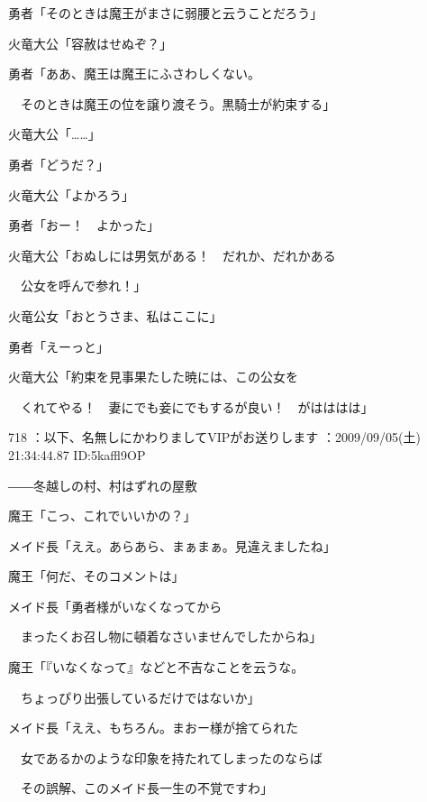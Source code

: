 \documentclass[a4j,twocolumn]{tarticle}
\begin{document}
勇者「そのときは魔王がまさに弱腰と云うことだろう」 



火竜大公「容赦はせぬぞ？」 



勇者「ああ、魔王は魔王にふさわしくない。\par{} 
　そのときは魔王の位を譲り渡そう。黒騎士が約束する」 



火竜大公「……」\par{} 
勇者「どうだ？」 



火竜大公「よかろう」\par{} 
勇者「おー！　よかった」 



火竜大公「おぬしには男気がある！　だれか、だれかある\par{} 
　公女を呼んで参れ！」 



火竜公女「おとうさま、私はここに」\par{} 
勇者「えーっと」 



火竜大公「約束を見事果たした暁には、この公女を\par{} 
　くれてやる！　妻にでも妾にでもするが良い！　がはははは」 

	
    
    

718 ：以下、名無しにかわりましてVIPがお送りします ：2009/09/05(土) 21:34:44.87 ID:5kaffl9OP 


――冬越しの村、村はずれの屋敷 



魔王「こっ、これでいいかの？」\par{} 
メイド長「ええ。あらあら、まぁまぁ。見違えましたね」 



魔王「何だ、そのコメントは」\par{} 
メイド長「勇者様がいなくなってから\par{} 
　まったくお召し物に頓着なさいませんでしたからね」 



魔王「『いなくなって』などと不吉なことを云うな。\par{} 
　ちょっぴり出張しているだけではないか」 



メイド長「ええ、もちろん。まおー様が捨てられた\par{} 
　女であるかのような印象を持たれてしまったのならば\par{} 
　その誤解、このメイド長一生の不覚ですわ」 
\end{document}
